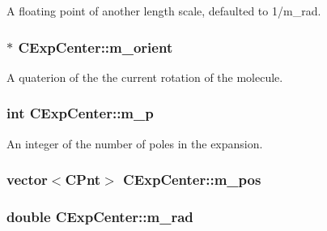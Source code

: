 A floating point of another length scale, defaulted to 1/m\-\_\-rad. 

\hypertarget{classCExpCenter_a49742562fd68129ab17aa716e6e661e8}{
\subsubsection[{m\-\_\-orient}]{$\ast$ C\-Exp\-Center\-::m\-\_\-orient\hspace{0.3cm}{\ttfamily [protected]}}}\label{classCExpCenter_a49742562fd68129ab17aa716e6e661e8}


A quaterion of the the current rotation of the molecule. 

\hypertarget{classCExpCenter_a2a3e3bc7c527c49e9ea4149dd33f4dba}{
\subsubsection[{m\-\_\-p}]{\setlength{\rightskip}{0pt plus 5cm}int C\-Exp\-Center\-::m\-\_\-p\hspace{0.3cm}{\ttfamily [protected]}}}\label{classCExpCenter_a2a3e3bc7c527c49e9ea4149dd33f4dba}


An integer of the number of poles in the expansion. 

\hypertarget{classCExpCenter_a6d2bc11475081445ad8838d6deb889d3}{
\subsubsection[{m\-\_\-pos}]{\setlength{\rightskip}{0pt plus 5cm}vector$<${\bf C\-Pnt}$>$ C\-Exp\-Center\-::m\-\_\-pos\hspace{0.3cm}{\ttfamily [protected]}}}\label{classCExpCenter_a6d2bc11475081445ad8838d6deb889d3}
\hypertarget{classCExpCenter_abc237f77679da4a21619a384e6ff4f6b}{
\subsubsection[{m\-\_\-rad}]{\setlength{\rightskip}{0pt plus 5cm}double C\-Exp\-Center\-::m\-\_\-rad\hspace{0.3cm}{\ttfamily [protected]}}}\label{classCExpCenter_abc237f77679da4a21619a384e6ff4f6b}


